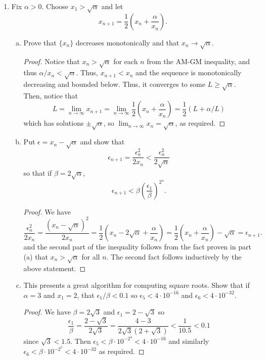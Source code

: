 \begin{enumerate}
\item %
Fix $\alpha > 0$. Choose $x_1 > \sqrt{\alpha}$ and let
\[
	x_{n+1} = \frac{1}{2} \left(x_n + \frac{\alpha}{x_n}\right).
\]
\begin{enumerate}[(a)]
\item Prove that $\{x_n\}$ decreases monotonically and that $x_n \to \sqrt{\alpha}$.

\begin{proof}
    Notice that $x_n > \sqrt{\alpha}$ for each $n$ from the AM-GM inequality, and thus $\alpha/x_n < \sqrt{\alpha}$. Thus, $x_{n+1} < x_n$ and the sequence is monotonically decreasing and bounded below. Thus, it converges to some $L \ge \sqrt{\alpha}$. Then, notice that 
    \[
        L = \lim_{n \to \infty} x_{n+1} = \lim_{n \to \infty} \frac{1}{2} \left(x_n + \frac{\alpha}{x_n} \right) = \frac{1}{2} (L + \alpha/L)
    \]
    which has solutions $\pm \sqrt{\alpha}$, so $\lim_{n \to \infty} x_n = \sqrt{\alpha}$, as required.
\end{proof}

\item Put $\epsilon = x_n - \sqrt{\alpha}$ and show that
\[
	\epsilon_{n+1} = \frac{\epsilon_n^2}{2x_n} < \frac{\epsilon_n^2}{2\sqrt{\alpha}}
\]
so that if $\beta = 2\sqrt{\alpha}$,
\[
	\epsilon_{n+1} < \beta\left(\frac{\epsilon_1}{\beta}\right)^{2^n}.
\]

\begin{proof}
    We have
    \[
        \frac{\epsilon_n^2}{2x_n} = \frac{(x_n - \sqrt{\alpha})^2}{2x_n} = \frac{1}{2} \left( x_n - 2\sqrt{\alpha} + \frac{\alpha}{x_n} \right) = \frac{1}{2} \left( x_n + \frac{\alpha}{x_n} \right) - \sqrt{\alpha} = \epsilon_{n+1}.
    \]
    and the second part of the inequality follows from the fact proven in part (a) that $x_n > \sqrt{\alpha}$ for all $n$. The second fact follows inductively by the above statement.
\end{proof}

\item This presents a great algorithm for computing square roots. Show that if $\alpha = 3$ and $x_1 = 2$, that $\epsilon_1/\beta < 0.1$ so $\epsilon_5 < 4 \cdot 10^{-16}$ and $\epsilon_6 < 4 \cdot 10^{-32}$.

\begin{proof}
    We have $\beta = 2\sqrt{3}$ and $\epsilon_1 = 2 - \sqrt{3}$ so
    \[
        \frac{\epsilon_1}{\beta} = \frac{2 - \sqrt{3}}{2 \sqrt{3}} = \frac{4 - 3}{2 \sqrt{3} (2 + \sqrt{3})} < \frac{1}{10.5} < 0.1
    \]
    since $\sqrt{3} < 1.5$. Then $\epsilon_5 < \beta \cdot 10^{-2^4} < 4 \cdot 10^{-16}$ and similarly $\epsilon_6 < \beta \cdot 10^{-2^5} < 4 \cdot 10^{-32}$ as required.
\end{proof}
\end{enumerate}


\end{enumerate}
